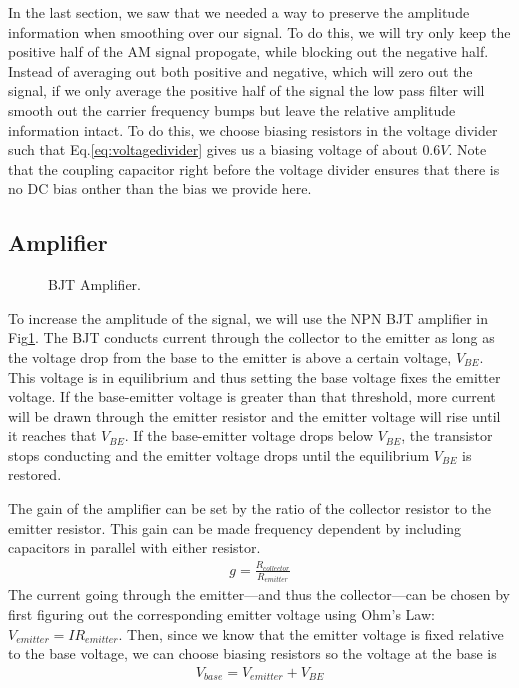\documentclass[12pt]{article}
\begin{document}
In the last section, we saw that we needed a way to preserve the amplitude information when smoothing over our signal. To do this, we will try only keep the positive half of the AM signal propogate, while blocking out the negative half. Instead of averaging out both positive and negative, which will zero out the signal, if we only average the positive half of the signal the low pass filter will smooth out the carrier frequency bumps but leave the relative amplitude information intact. To do this, we choose biasing resistors in the voltage divider such that Eq.\ref{eq:voltagedivider} gives us a biasing voltage of about $0.6V$. Note that the coupling capacitor right before the voltage divider ensures that there is no DC bias onther than the bias we provide here.

\subsection*{Amplifier}
\begin{figure}[H]
\caption{BJT Amplifier.}
\label{fig:amplifier_diagram}
\end{figure}

To increase the amplitude of the signal, we will use the NPN BJT amplifier in Fig\ref{fig:amplifier_diagram}. The BJT conducts current through the collector to the emitter as long as the voltage drop from the base to the emitter is above a certain voltage, $V_{BE}$. This voltage is in equilibrium and thus setting the base voltage fixes the emitter voltage. If the base-emitter voltage is greater than that threshold, more current will be drawn through the emitter resistor and the emitter voltage will rise until it reaches that $V_{BE}$. If the base-emitter voltage drops below $V_{BE}$, the transistor stops conducting and the emitter voltage drops until the equilibrium $V_{BE}$ is restored.

The gain of the amplifier can be set by the ratio of the collector resistor to the emitter resistor. This gain can be made frequency dependent by including capacitors in parallel with either resistor.
\begin{eqnarray}
g = \frac{R_{collector}}{R_{emitter}} \label{amplifiergain}
\end{eqnarray}
The current going through the emitter---and thus the collector---can be chosen by first figuring out the corresponding emitter voltage using Ohm's Law: $V_{emitter}=IR_{emitter}$. Then, since we know that the emitter voltage is fixed relative to the base voltage, we can choose biasing resistors so the voltage at the base is
\begin{eqnarray}
V_{base} = V_{emitter} + V_{BE} \label{vbase}
\end{eqnarray}
\end{document}
